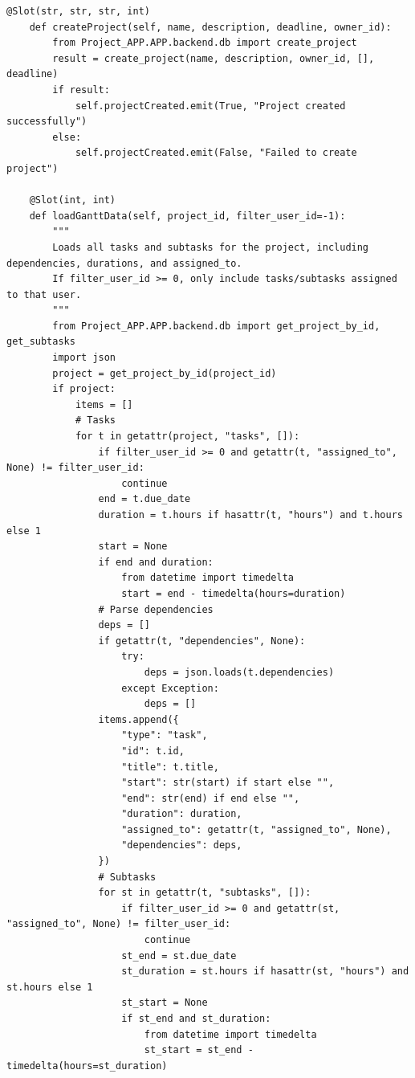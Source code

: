\documentclass{report}
\begin{document}
\begin{lstlisting}[style=pythonstyle]
    @Slot(str, str, str, int)
    def createProject(self, name, description, deadline, owner_id):
        from Project_APP.APP.backend.db import create_project
        result = create_project(name, description, owner_id, [], deadline)
        if result:
            self.projectCreated.emit(True, "Project created successfully")
        else:
            self.projectCreated.emit(False, "Failed to create project")

    @Slot(int, int)
    def loadGanttData(self, project_id, filter_user_id=-1):
        """
        Loads all tasks and subtasks for the project, including dependencies, durations, and assigned_to.
        If filter_user_id >= 0, only include tasks/subtasks assigned to that user.
        """
        from Project_APP.APP.backend.db import get_project_by_id, get_subtasks
        import json
        project = get_project_by_id(project_id)
        if project:
            items = []
            # Tasks
            for t in getattr(project, "tasks", []):
                if filter_user_id >= 0 and getattr(t, "assigned_to", None) != filter_user_id:
                    continue
                end = t.due_date
                duration = t.hours if hasattr(t, "hours") and t.hours else 1
                start = None
                if end and duration:
                    from datetime import timedelta
                    start = end - timedelta(hours=duration)
                # Parse dependencies
                deps = []
                if getattr(t, "dependencies", None):
                    try:
                        deps = json.loads(t.dependencies)
                    except Exception:
                        deps = []
                items.append({
                    "type": "task",
                    "id": t.id,
                    "title": t.title,
                    "start": str(start) if start else "",
                    "end": str(end) if end else "",
                    "duration": duration,
                    "assigned_to": getattr(t, "assigned_to", None),
                    "dependencies": deps,
                })
                # Subtasks
                for st in getattr(t, "subtasks", []):
                    if filter_user_id >= 0 and getattr(st, "assigned_to", None) != filter_user_id:
                        continue
                    st_end = st.due_date
                    st_duration = st.hours if hasattr(st, "hours") and st.hours else 1
                    st_start = None
                    if st_end and st_duration:
                        from datetime import timedelta
                        st_start = st_end - timedelta(hours=st_duration)

\end{lstlisting}
\end{document}
